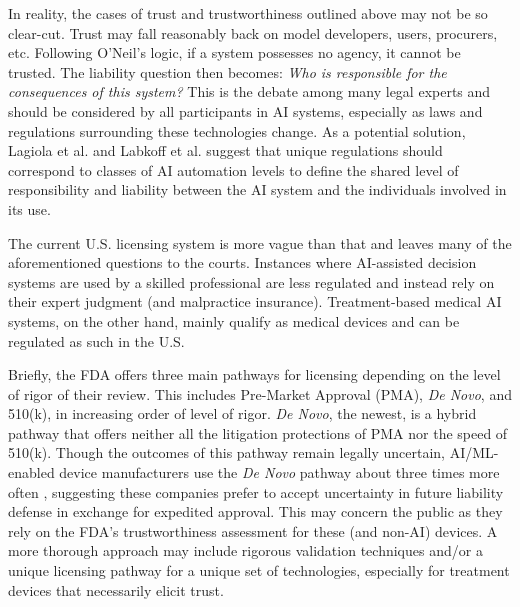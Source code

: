 \documentclass[preprint,12pt]{elsarticle}
\begin{document}
In reality, the cases of trust and trustworthiness outlined above may not be so
clear-cut. Trust may fall reasonably back on model developers, users, procurers,
etc. Following O'Neil's logic, if a system possesses no agency, it cannot be
trusted. The liability question then becomes: \textit{Who is responsible for the
consequences of this system?} This is the debate among many legal experts and
should be considered by all participants in AI systems, especially as laws and
regulations surrounding these technologies change. As a potential solution,
Lagiola et al. \cite{lagioiaStrangeCaseDr2020} and Labkoff et al.
\cite{labkoffResponsibleFutureRecommendations2024} suggest that unique
regulations should correspond to classes of AI automation levels to define the
shared level of responsibility and liability between the AI system and the
individuals involved in its use. 

The current U.S. licensing system is more vague than that and leaves many of the
aforementioned questions to the courts. Instances where AI-assisted decision
systems are used by a skilled professional are less regulated and instead rely
on their expert judgment (and malpractice insurance). Treatment-based medical
AI systems, on the other hand, mainly qualify as medical devices and can be
regulated as such in the U.S. 

Briefly, the FDA offers three main pathways for licensing depending on the level
of rigor of their review. This includes Pre-Market Approval (PMA), \textit{De
Novo}, and 510(k), in increasing order of level of rigor. \textit{De Novo}, the
newest, is a hybrid pathway that offers neither all the litigation protections
of PMA nor the speed of 510(k). Though the outcomes of this pathway remain
legally uncertain, AI/ML-enabled device manufacturers use the \textit{De Novo}
pathway about three times more often \cite{gerkeNewCaseLaw2025}, suggesting
these companies prefer to accept uncertainty in future liability defense in
exchange for expedited approval. This may concern the public as they rely on the
FDA's trustworthiness assessment for these (and non-AI) devices. A more thorough
approach may include rigorous validation techniques and/or a unique licensing
pathway for a unique set of technologies, especially for treatment devices that
necessarily elicit trust.
\end{document}
